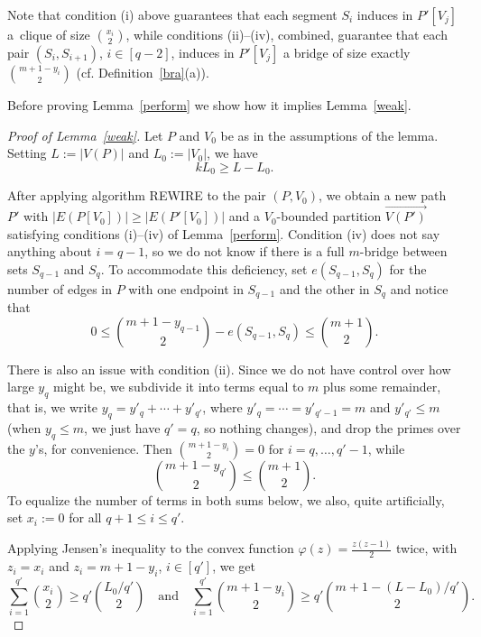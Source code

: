 \documentclass[reqno, 12pt]{amsart}
\numberwithin{equation}{section}
\numberwithin{figure}{section}
\theoremstyle{plain}
\theoremstyle{definition}
\let\phi=\varphi
\begin{document}
Note that condition (i) above guarantees that each segment $S_i$ induces in $P'[V_{j}]$ a~clique of size ${x_i\choose 2}$, while conditions (ii)--(iv), combined, guarantee that each pair $(S_i, S_{i+1})$, $i\in[q-2]$, induces in $P'[V_{j}]$ a bridge of size exactly ${m+1-y_i\choose 2}$ (cf. Definition~\ref{bra}(a)).

Before proving Lemma~\ref{perform} we show how it implies Lemma~\ref{weak}.

\begin{proof}[Proof of Lemma~\ref{weak}] Let $P$ and $V_0$ be as in the assumptions of the lemma. Setting $L:=|V(P)|$ and $L_0:=|V_0|$, we have
\begin{equation}\label{eq:largest_color}
    k L_0 \ge L - L_0.
\end{equation}

After applying algorithm REWIRE to the pair $(P,V_0)$, we obtain a new path $P'$ with $|E(P[V_0])| \geq |E(P'[V_0])|$ and a $V_0$-bounded partition $\overrightarrow{V(P')}$ satisfying conditions (i)--(iv) of Lemma~\ref{perform}. Condition (iv) does not say anything about $i=q-1$, so we do not know if there is a full $m$-bridge between sets $S_{q-1}$ and $S_q$. To accommodate this deficiency, set $e(S_{q-1},S_q)$ for the number of edges in $P$ with one endpoint in $S_{q-1}$ and the other in $S_q$ and notice that
\begin{equation}\label{lastbridge}
0\le{m+1-y_{q-1}\choose 2}-e(S_{q-1},S_q)\le\binom{m+1}2.
\end{equation}

There is also an issue with condition (ii). Since  we do not have control over how large $y_q$ might be, we subdivide it into terms equal to $m$ plus some remainder, that is, we write
$y_q=y'_q+\cdots+ y'_{q'}$, where $y'_q=\cdots=y'_{q'-1}=m$ and $y'_{q'}\le m$ (when $y_q\le m$, we just have $q'=q$, so nothing changes), and drop the primes over the $y$'s, for convenience. Then ${m+1-y_{i}\choose 2}=0$ for $i=q,\dots, q'-1$, while
\begin{equation}\label{lasty}
{m+1-y_{q'}\choose 2}\le\binom{m+1}2.
\end{equation}
To equalize the number of terms in both sums below, we also, quite artificially, set $x_i:=0$ for all $q+1\le i\le q'$.


 Applying Jensen's inequality to the convex function $\phi(z) = \frac{z(z-1)}{2}$ twice,  with $z_i=x_i$ and $z_i=m+1-y_i$, $i\in[q']$,
 we get
 \begin{equation}\label{Jensen}
 \sum_{i=1}^{q'} {x_i \choose 2}\ge q'{L_0/q' \choose 2}\quad\mbox{and}\quad\sum_{i=1}^{q'} {m+1-y_i\choose 2}\geq q'{m+1-(L-L_0)/q' \choose 2}.
 \end{equation}


\end{proof}
\end{document}
